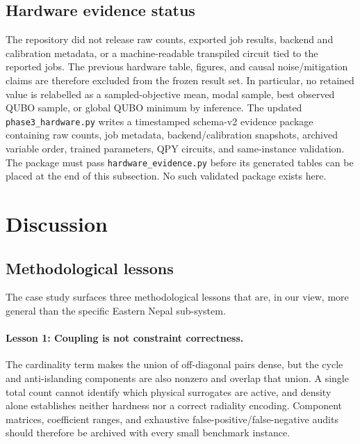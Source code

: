 \documentclass[5p,twocolumn,number,sort&compress,nopreprintline]{elsarticle}
\newcommand{\code}[1]{\texttt{\small #1}}
\begin{document}
\subsection{Hardware evidence status}
\label{sec:results-hardware}
The repository did not release raw counts, exported job results,
backend and calibration metadata, or a machine-readable transpiled
circuit tied to the reported jobs. The previous hardware table,
figures, and causal noise/mitigation claims are therefore excluded
from the frozen result set. In particular, no retained value is relabelled
as a sampled-objective mean, modal sample, best observed QUBO sample, or global
QUBO minimum by inference.
The updated \code{phase3\_hardware.py} writes a timestamped schema-v2
evidence package containing raw counts, job metadata, backend/calibration
snapshots, archived variable order, trained parameters, QPY circuits, and
same-instance validation. The package must pass
\code{hardware\_evidence.py} before its generated tables can be placed at
the end of this subsection. No such validated package exists here.

\FloatBarrier

\section{Discussion}
\label{sec:discussion}

\subsection{Methodological lessons}
The case study surfaces three methodological lessons that are, in our
view, more general than the specific Eastern Nepal sub-system.

\paragraph{Lesson 1: Coupling is not constraint correctness.}
The cardinality term makes the union of off-diagonal pairs dense, but
the cycle and anti-islanding components are also nonzero and overlap
that union. A single total count cannot identify which physical
surrogates are active, and density alone establishes neither hardness
nor a correct radiality encoding. Component matrices, coefficient
ranges, and exhaustive false-positive/false-negative audits should
therefore be archived with every small benchmark instance.
\end{document}
